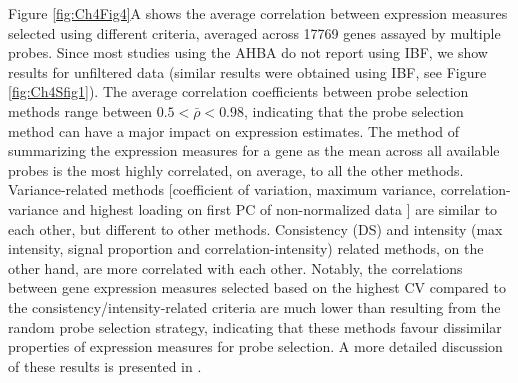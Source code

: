 \documentclass[10pt,A4]{article}
\begin{document}
Figure \ref{fig:Ch4Fig4}A shows the average correlation between expression measures selected using different criteria, averaged across \num{17769} genes assayed by multiple probes. Since most studies using the AHBA do not report using IBF, we show results for unfiltered data (similar results were obtained using IBF, see Figure \ref{fig:Ch4Sfig1}). The average correlation coefficients between probe selection methods range between $0.5 < \bar{\rho} < 0.98$, indicating that the probe selection method can have a major impact on expression estimates. The method of summarizing the expression measures for a gene as the mean across all available probes is the most highly correlated, on average, to all the other methods. Variance-related methods [coefficient of variation, maximum variance, correlation-variance and highest loading on first PC of non-normalized data \citep{Parkes2017}] are similar to each other, but different to other methods. Consistency (DS) and intensity (max intensity, signal proportion and correlation-intensity) related methods, on the other hand, are more correlated with each other. Notably, the correlations between gene expression measures selected based on the highest CV compared to the consistency/intensity-related criteria are much lower than resulting from the random probe selection strategy, indicating that these methods favour dissimilar properties of expression measures for probe selection. A more detailed discussion of these results is presented in .
\end{document}
